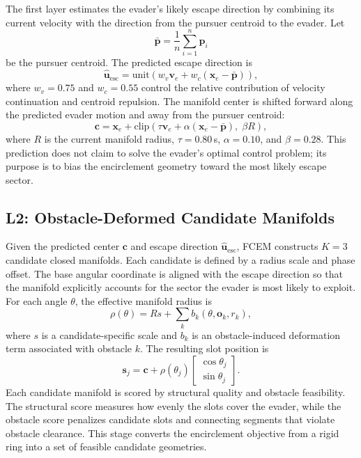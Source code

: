 \documentclass[journal]{IEEEtran}
\begin{document}
The first layer estimates the evader's likely escape direction by combining its current velocity with the direction from the pursuer centroid to the evader.
Let
\begin{equation}
  \bar{\mathbf{p}} = \frac{1}{n}\sum_{i=1}^n \mathbf{p}_i
\end{equation}
be the pursuer centroid.
The predicted escape direction is
\begin{equation}
  \hat{\mathbf{u}}_{\mathrm{esc}} =
  \mathrm{unit}\!\left(
    w_v \mathbf{v}_e + w_c (\mathbf{x}_e - \bar{\mathbf{p}})
  \right),
  \label{eq:esc_dir}
\end{equation}
where $w_v = 0.75$ and $w_c = 0.55$ control the relative contribution of velocity continuation and centroid repulsion.
The manifold center is shifted forward along the predicted evader motion and away from the pursuer centroid:
\begin{equation}
  \mathbf{c} = \mathbf{x}_e + \mathrm{clip}\!\left(
    \tau \mathbf{v}_e + \alpha (\mathbf{x}_e - \bar{\mathbf{p}}),\; \beta R
  \right),
  \label{eq:center}
\end{equation}
where $R$ is the current manifold radius, $\tau = 0.80$\,s, $\alpha = 0.10$, and $\beta = 0.28$.
This prediction does not claim to solve the evader's optimal control problem; its purpose is to bias the encirclement geometry toward the most likely escape sector.

\subsection{L2: Obstacle-Deformed Candidate Manifolds}
\label{sec:l2}

Given the predicted center $\mathbf{c}$ and escape direction $\hat{\mathbf{u}}_{\mathrm{esc}}$, FCEM constructs $K=3$ candidate closed manifolds.
Each candidate is defined by a radius scale and phase offset.
The base angular coordinate is aligned with the escape direction so that the manifold explicitly accounts for the sector the evader is most likely to exploit.
For each angle $\theta$, the effective manifold radius is
\begin{equation}
  \rho(\theta) = R s + \sum_k b_k(\theta, \mathbf{o}_k, r_k),
  \label{eq:radius_deform}
\end{equation}
where $s$ is a candidate-specific scale and $b_k$ is an obstacle-induced deformation term associated with obstacle $k$.
The resulting slot position is
\begin{equation}
  \mathbf{s}_j = \mathbf{c} + \rho(\theta_j)
  \begin{bmatrix} \cos\theta_j \\ \sin\theta_j \end{bmatrix}.
\end{equation}
Each candidate manifold is scored by structural quality and obstacle feasibility.
The structural score measures how evenly the slots cover the evader, while the obstacle score penalizes candidate slots and connecting segments that violate obstacle clearance.
This stage converts the encirclement objective from a rigid ring into a set of feasible candidate geometries.
\end{document}
